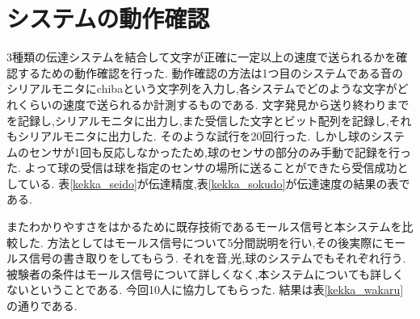 \section{システムの動作確認}

3種類の伝達システムを結合して文字が正確に一定以上の速度で送られるかを確認するための動作確認を行った.
動作確認の方法は1つ目のシステムである音のシリアルモニタにchibaという文字列を入力し,各システムでどのような文字がどれくらいの速度で送られるか計測するものである.
文字発見から送り終わりまでを記録し,シリアルモニタに出力し,また受信した文字とビット配列を記録し,それもシリアルモニタに出力した.
そのような試行を20回行った.
しかし球のシステムのセンサが1回も反応しなかったため,球のセンサの部分のみ手動で記録を行った.
よって球の受信は球を指定のセンサの場所に送ることができたら受信成功としている.
表\ref{kekka_seido}が伝達精度,表\ref{kekka_sokudo}が伝達速度の結果の表である.


またわかりやすさをはかるために既存技術であるモールス信号と本システムを比較した.
方法としてはモールス信号について5分間説明を行い,その後実際にモールス信号の書き取りをしてもらう.
それを音,光,球のシステムでもそれぞれ行う.
被験者の条件はモールス信号について詳しくなく,本システムについても詳しくないということである.
今回10人に協力してもらった.
結果は表\ref{kekka_wakaru}の通りである.



